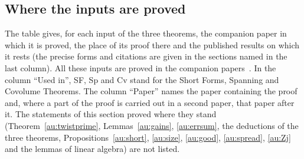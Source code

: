 \documentclass[10pt]{amsart}
\theoremstyle{definition}
\theoremstyle{remark}
\begin{document}
\subsection{Where the inputs are proved}\label{ss:au-remains}

The table gives, for each input of the three theorems, the companion paper in which it is
proved, the place of its proof there and the
published results on which it rests (the precise forms and citations are given in the sections
named in the last column). All these inputs are proved in the companion papers~\cite{P49,P50,P51,P52,P53,P54,P55,P56}. In the column ``Used in'', SF, Sp and Cv stand for the Short Forms, Spanning and Covolume Theorems. The column ``Paper'' names the paper containing the proof and, where a part of the proof is
carried out in a second paper, that paper after it. The statements of this section proved where they stand
(Theorem~\ref{au:twistprime}, Lemmas~\ref{au:gains}, \ref{au:errsum}, the deductions of
the three theorems, Propositions~\ref{au:short}, \ref{au:size}, \ref{au:good}, \ref{au:spread},
\ref{au:Zj} and the lemmas of linear algebra) are not listed.
\end{document}

